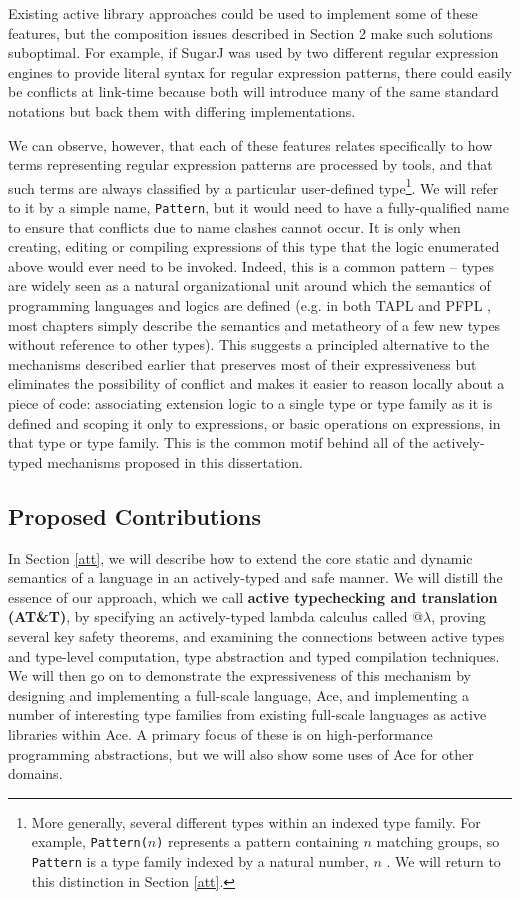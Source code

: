 Existing active library approaches could be used to implement some of these features, but the composition issues described in Section 2 make such solutions suboptimal. For example, if SugarJ was used by two different regular expression engines to provide literal syntax for regular expression patterns, there could easily be conflicts at link-time because both will introduce many of the same standard notations but back them with differing implementations. 

We can observe, however, that each of these features relates specifically to how terms representing regular expression patterns are processed by tools, and that such terms are always classified by a particular user-defined type\footnote{More generally, several different types within an indexed type family. For example, \texttt{Pattern(}$n$\texttt{)}  represents a pattern containing $n$ matching groups, so \texttt{Pattern} is  a type family indexed by a natural number, $n$ \cite{regex-type-system}. We will return to this distinction in Section \ref{att}.}. We will refer to it by a simple name, \verb|Pattern|, but it would need to have a fully-qualified name to ensure that conflicts due to name clashes cannot occur. It is only when creating, editing or compiling expressions of this type that the logic enumerated above would ever need to be invoked. Indeed, this is a common pattern -- types are widely seen as a natural organizational unit around which the semantics of programming languages and logics are defined (e.g. in both TAPL \cite{tapl} and PFPL \cite{pfpl}, most chapters simply describe the semantics and metatheory of a few new types without reference to other types). This suggests a principled alternative to the mechanisms described earlier that preserves most of their expressiveness but eliminates the possibility of conflict and makes it easier to reason locally about a piece of code: associating extension logic to a single type or type family as it is defined and scoping it only to expressions, or basic operations on expressions, in that type or type family. This is the common motif behind all of the {actively-typed} mechanisms proposed in this dissertation.

\subsection{Proposed Contributions}
In Section \ref{att}, we will describe how to extend the core static and dynamic semantics of a language in an actively-typed and safe manner. We will distill the essence of our approach, which we call \textbf{active typechecking and translation (AT\&T)}, by specifying an actively-typed lambda calculus called @$\lambda$, proving several key safety theorems, and examining the connections between active types and type-level computation, type abstraction and typed compilation techniques. We will then go on to demonstrate the expressiveness of this mechanism by designing and implementing a full-scale language, Ace, and implementing a number of interesting type families from existing full-scale languages as active libraries within Ace. A primary focus of these is on high-performance  programming abstractions, but we will also show some uses of Ace for other domains.

